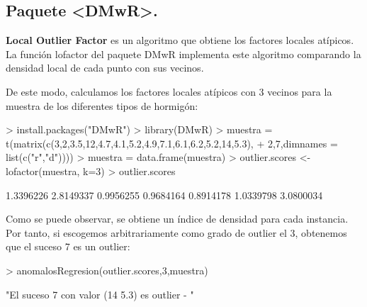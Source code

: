 \documentclass [a4paper] {article}
\begin{document}
\subsection{Paquete <DMwR>.}
\bigskip
\textbf{Local Outlier Factor} es un algoritmo que obtiene los factores locales atípicos. La función lofactor del 
paquete DMwR implementa este algoritmo comparando la densidad local de cada punto con sus vecinos.

\bigskip
De este modo, calculamos los factores locales atípicos con 3 vecinos para la muestra de los diferentes 
tipos de hormigón: 
\begin{Schunk}
\begin{Sinput}
> install.packages("DMwR")
> library(DMwR)
> muestra = t(matrix(c(3,2,3.5,12,4.7,4.1,5.2,4.9,7.1,6.1,6.2,5.2,14,5.3),
+         2,7,dimnames = list(c("r","d"))))
> muestra = data.frame(muestra)
> outlier.scores <- lofactor(muestra, k=3)
> outlier.scores
\end{Sinput}
\begin{Soutput}
[1] 1.3396226 2.8149337 0.9956255 0.9684164 0.8914178 1.0339798 3.0800034
\end{Soutput}
\end{Schunk}

\bigskip
Como se puede observar, se obtiene un índice de densidad para cada instancia. Por tanto, si escogemos arbitrariamente
como grado de outlier el 3, obtenemos que el suceso 7 es un outlier:
\begin{Schunk}
\begin{Sinput}
> anomalosRegresion(outlier.scores,3,muestra)
\end{Sinput}
\begin{Soutput}
[1] "El suceso 7 con valor (14 5.3) es outlier - "
\end{Soutput}
\end{Schunk}
\end{document}
